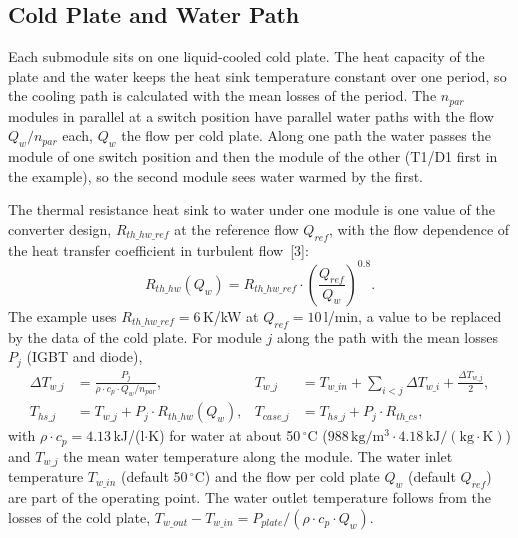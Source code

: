 \subsection{Cold Plate and Water Path}
\label{sec:cooling}

Each submodule sits on one liquid-cooled cold plate. The heat capacity of the plate and the water keeps the heat sink
temperature constant over one period, so the cooling path is calculated with the mean losses of the period. The
$n_{par}$ modules in parallel at a switch position have parallel water paths with the flow $Q_w / n_{par}$ each,
$Q_w$ the flow per cold plate. Along one path the water passes the module of one switch position and then the module
of the other (T1/D1 first in the example), so the second module sees water warmed by the first.

The thermal resistance heat sink to water under one module is one value of the converter design, $R_{th\_hw\_ref}$
at the reference flow $Q_{ref}$, with the flow dependence of the heat transfer coefficient in turbulent flow~[3]:
\begin{equation}
  R_{th\_hw}(Q_w) = R_{th\_hw\_ref} \cdot \left( \frac{Q_{ref}}{Q_w} \right)^{0.8} .
\end{equation}
The example uses $R_{th\_hw\_ref} = 6$\,K/kW at $Q_{ref} = 10$\,l/min, a value to be replaced by the data of the
cold plate. For module $j$ along the path with the mean losses $P_j$ (IGBT and diode),
\begin{align}
  \Delta T_{w\_j} &= \frac{P_j}{\rho \cdot c_p \cdot Q_w / n_{par}} , &
  T_{w\_j} &= T_{w\_in} + \sum_{i<j} \Delta T_{w\_i} + \frac{\Delta T_{w\_j}}{2} , \\
  T_{hs\_j} &= T_{w\_j} + P_j \cdot R_{th\_hw}(Q_w) , &
  T_{case\_j} &= T_{hs\_j} + P_j \cdot R_{th\_cs} ,
\end{align}
with $\rho \cdot c_p = 4.13$\,kJ/(l$\cdot$K) for water at about 50\,$^{\circ}$C ($988\,\mathrm{kg/m^3} \cdot
4.18\,\mathrm{kJ/(kg \cdot K)}$) and $T_{w\_j}$ the mean water temperature along the module. The water inlet
temperature $T_{w\_in}$ (default 50\,$^{\circ}$C) and the flow per cold plate $Q_w$ (default $Q_{ref}$) are part of the
operating point. The water outlet temperature follows from the losses of the cold plate,
$T_{w\_out} - T_{w\_in} = P_{plate} / (\rho \cdot c_p \cdot Q_w)$.
